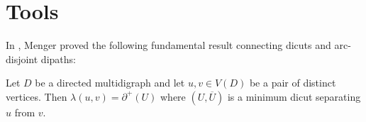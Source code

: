 








\section{Tools}\label{sec:tools}

In \cite{M27}, Menger proved the following fundamental result connecting dicuts and arc-disjoint dipaths:

\begin{theorem}\label{thm:menger}
    Let $D$ be a directed multidigraph and let $u, v \in V(D)$ be a pair of distinct vertices. Then $\lambda(u,v)=\partial^+(U)$ where $(U, \overline{U})$ is a minimum  dicut separating $u$ from $v$. 
\end{theorem}



